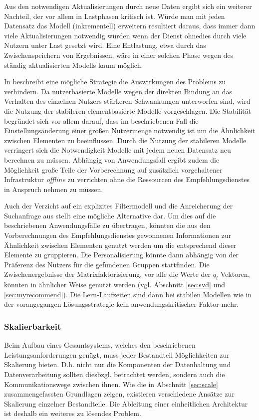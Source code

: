 Aus den notwendigen Aktualisierungen durch neue Daten ergibt sich ein weiterer Nachteil, der vor allem in Lastphasen kritisch ist. Würde man mit jeden Datensatz das Modell (inkrementell) erweitern resultiert daraus, dass immer dann viele Aktualisierungen notwendig würden wenn der Dienst ohnedies durch viele Nutzern unter Last gesetzt wird. Eine Entlastung, etwa durch das Zwischenspeichern von Ergebnissen, wäre in einer solchen Phase wegen des ständig aktualisierten Modells kaum möglich.

In \citep{linden03} beschreibt eine mögliche Strategie die Auswirkungen des Problems zu verhindern. Da nutzerbasierte Modelle wegen der direkten Bindung an das Verhalten des einzelnen Nutzers stärkeren Schwankungen unterworfen sind, wird die Nutzung der stabileren elementbasierte Modelle vorgeschlagen. Die Stabilität begründet sich vor allem darauf, dass im beschriebenen Fall die Einstellungsänderung einer großen Nutzermenge notwendig ist um die Ähnlichkeit zwischen Elementen zu beeinflussen. Durch die Nutzung der stabileren Modelle verringert sich die Notwendigkeit Modelle mit jedem neuen Datensatz neu berechnen zu müssen. Abhängig von Anwendungsfall ergibt zudem die Möglichkeit große Teile der Vorberechnung auf zusätzlich vorgehaltener Infrastruktur \textit{offline} zu verrichten ohne die Ressourcen des Empfehlungsdienstes in Anspruch nehmen zu müssen.

Auch der Verzicht auf ein explizites Filtermodell und die Anreicherung der Suchanfrage aus \citep{Boughareb11} stellt eine mögliche Alternative dar. Um dies auf die beschriebenen Anwendungsfälle zu übertragen, könnten die aus den Vorberechnungen des Empfehlungsdienstes gewonnenen Informationen zur Ähnlichkeit zwischen Elementen genutzt werden um die entsprechend dieser Elemente zu gruppieren. Die Personalisierung könnte dann abhängig von der Präferenz des Nutzers für die gefundenen Gruppen stattfinden. Die Zwischenergebnisse der Matrixfaktorisierung, vor alle die Werte der $q_i$ Vektoren, könnten in ähnlicher Weise genutzt werden (vgl. Abschnitt \ref{sec:svd} und \ref{sec:myrecommend}). Die Lern-Laufzeiten sind dann bei stabilen Modellen wie in der vorangegangen Lösungsstrategie kein anwendungskritischer Faktor mehr.

\subsubsection{Skalierbarkeit}\label{sec:scale2}

Beim Aufbau eines  Gesamtsystems, welches den beschriebenen Leistungsanforderungen genügt, muss jeder Bestandteil Möglichkeiten zur Skalierung bieten. D.h. nicht nur die Komponenten der Datenhaltung und Datenverarbeitung sollten diesbzgl. betrachtet werden, sondern auch die Kommunikationswege zwischen ihnen. Wie die in Abschnitt \ref{sec:scale} zusammengefassten Grundlagen zeigen, existieren verschiedene Ansätze zur Skalierung einzelner Bestandteile. Die Ableitung einer einheitlichen Architektur ist deshalb ein weiteres zu lösendes Problem.

